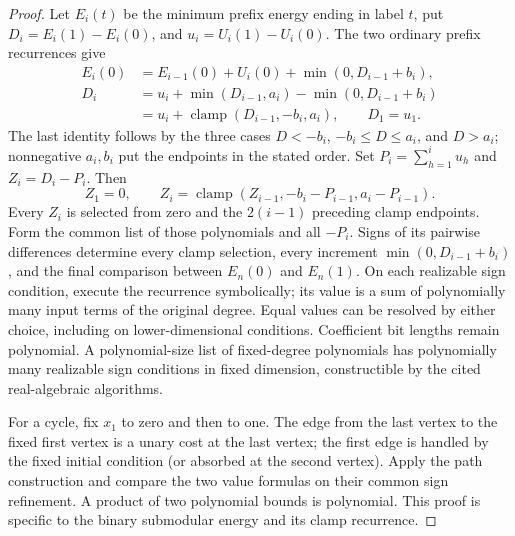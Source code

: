 \begin{proof}
Let $E_i(t)$ be the minimum prefix energy ending in label $t$, put
$D_i=E_i(1)-E_i(0)$, and $u_i=U_i(1)-U_i(0)$. The two ordinary
prefix recurrences give
\begin{align*}
 E_i(0)&=E_{i-1}(0)+U_i(0)+\min(0,D_{i-1}+b_i),\\
 D_i&=u_i+\min(D_{i-1},a_i)-\min(0,D_{i-1}+b_i)\\
    &=u_i+\operatorname{clamp}(D_{i-1},-b_i,a_i),
 \qquad D_1=u_1.
\end{align*}
The last identity follows by the three cases $D<-b_i$,
$-b_i\le D\le a_i$, and $D>a_i$; nonnegative $a_i,b_i$ put the
endpoints in the stated order. Set $P_i=\sum_{h=1}^iu_h$ and
$Z_i=D_i-P_i$. Then
\begin{equation}
 Z_1=0,\qquad Z_i=\operatorname{clamp}
          (Z_{i-1},-b_i-P_{i-1},a_i-P_{i-1}).
 \label{s5:clamp-recurrence}
\end{equation}
Every $Z_i$ is selected from zero and the $2(i-1)$ preceding clamp
endpoints. Form the common list of those polynomials and all $-P_i$.
Signs of its pairwise differences determine every clamp selection,
every increment $\min(0,D_{i-1}+b_i)$, and the final comparison between
$E_n(0)$ and $E_n(1)$. On each realizable sign condition, execute the
recurrence symbolically; its value is a sum of polynomially many input
terms of the original degree. Equal values can be resolved by either
choice, including on lower-dimensional conditions. Coefficient bit lengths
remain polynomial. A polynomial-size list of fixed-degree polynomials
has polynomially many realizable sign conditions in fixed dimension,
constructible by the cited real-algebraic algorithms.

For a cycle, fix $x_1$ to zero and then to one. The edge from the last
vertex to the fixed first vertex is a unary cost at the last vertex;
the first edge is handled by the fixed initial condition (or absorbed
at the second vertex). Apply the path construction and compare the two
value formulas on their common sign refinement. A product of two
polynomial bounds is polynomial. This proof is specific to the binary
submodular energy and its clamp recurrence.
\end{proof}

